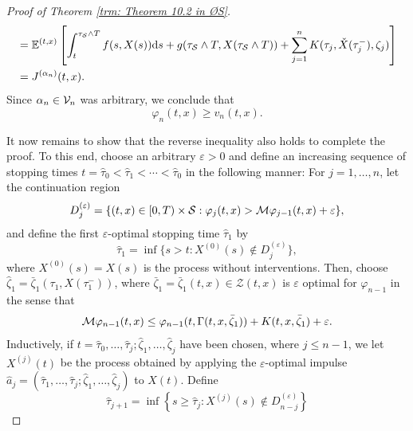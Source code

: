 \begin{proof}[Proof of Theorem \ref{trm: Theorem 10.2 in ØS}]
\begin{align}
        & = \mathbb{E}^{(t,x)} \left[ \int_t^{\tau_{\mathcal{S}} \wedge T} f(s,X(s)) \mathrm{d} s + g(\tau_{\mathcal{S}} \wedge T,X(\tau_{\mathcal{S}} \wedge T))+ \sum_{j=1}^n K(\tau_j,\check{X}(\tau_j^-),\zeta_j) \right] \nonumber \\
        &= J^{(\alpha_n)}(t,x).
        \label{eqn: (10.1.27) in ØS}
    \end{align}
    Since $\alpha_n \in \mathcal{V}_n$ was arbitrary, we conclude that 
    \begin{equation}
        \varphi_n(t,x) \geq v_n(t,x). 
        \label{eqn: (10.1.28) in ØS}
    \end{equation}

    It now remains to show that the reverse inequality also holds to complete the proof. To this end, choose an arbitrary $\varepsilon >0$ and define an increasing sequence of stopping times $t=\hat{\tau}_0 < \hat{\tau}_1 < \cdots < \hat{\tau}_0$ in the following manner: For $j=1,\ldots,n$, let the continuation region 
    \begin{equation}
        D_j^{(\varepsilon)} = \{ (t,x) \in [0,T) \times \mathcal{S}: \varphi_j(t,x) > \mathcal{M} \varphi_{j-1}(t,x) + \varepsilon \},
        \label{eqn: (10.1.29) in ØS}
    \end{equation}
    and define the first $\varepsilon$-optimal stopping time $\hat{\tau}_1$ by
    \begin{equation}
        \hat{\tau}_1 = \inf \{ s > t: X^{(0)}(s) \notin D_j^{(\varepsilon)} \},
        \label{eqn: (10.1.30) in ØS}
    \end{equation}
    where $X^{(0)}(s) = X(s)$ is the process without interventions. Then, choose $\hat{\zeta}_1 = \bar{\zeta}_1(\tau_1, X(\tau_1^-))$, where $\bar{\zeta}_1 = \bar{\zeta}_1(t, x) \in \mathcal{Z}(t,x)$ is $\varepsilon$ optimal for $\varphi_{n-1}$ in the sense that 
    \begin{equation}
        \mathcal{M} \varphi_{n-1}(t,x) \leq \varphi_{n-1}(t, \Gamma(t,x, \bar{\zeta}_{1})) + K(t,x,\bar{\zeta}_{1}) + \varepsilon.
        \label{eqn: (10.1.31) in ØS}
    \end{equation}
    Inductively, if $t = \hat{\tau}_0, \ldots, \hat{\tau}_j; \hat{\zeta}_1, \ldots, \hat{\zeta}_j$ have been chosen, where $j\leq n-1$, we let $X^{(j)}(t)$ be the process obtained by applying the $\varepsilon$-optimal impulse $\hat{a}_j = (\hat{\tau}_1, \ldots, \hat{\tau}_j; \hat{\zeta}_1, \ldots, \hat{\zeta}_j)$ to $X(t)$. Define 
    \begin{equation}
        \hat{\tau}_{j+1} = \inf\left\{s \geq \hat{\tau}_j: X^{(j)}(s) \notin D_{n-j}^{(\varepsilon)} \right\}

\end{equation}
\end{proof}
